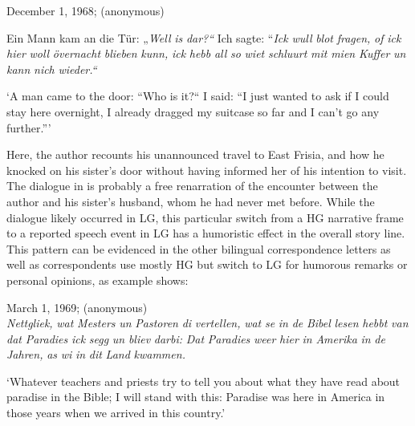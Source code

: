 \documentclass[output=paper]{langsci/langscibook}
\begin{document}
  
\ea
\label{ex:rocker:11}
December 1, 1968; (anonymous)\smallskip\\\relax 
 
Ein Mann kam an die Tür: „\textit{Well} \textit{is} \textit{dar?“} Ich sagte: “\textit{Ick} \textit{wull} \textit{blot} \textit{fragen,} \textit{of} \textit{ick} \textit{hier} \textit{woll} \textit{övernacht} \textit{blieben} \textit{kunn,} \textit{ick} \textit{hebb} \textit{all} \textit{so} \textit{wiet} \textit{schluurt} \textit{mit} \textit{mien} \textit{Kuffer} \textit{un} \textit{kann} \textit{nich} \textit{wieder.“}\smallskip\\\relax 

‘A man came to the door: “Who is it?“ I said: “I just wanted to ask if I could stay here overnight, I already dragged my suitcase so far and I can’t go any further.”’
\z

Here, the author recounts his unannounced travel to East Frisia, and how he knocked on his sister’s door without having informed her of his intention to visit. The dialogue in  is probably a free renarration of the encounter between the author and his sister’s husband, whom he had never met before. While the dialogue likely occurred in LG, this particular switch from a HG narrative frame to a reported speech event in LG has a humoristic effect in the overall story line. This pattern can be evidenced in the other bilingual correspondence letters as well as correspondents use mostly HG but switch to LG for humorous remarks or personal opinions, as example  shows:

 
\ea
\label{ex:rocker:12} 
March 1, 1969; (anonymous)\smallskip\\\relax 
\textit{Nettgliek,} \textit{wat} \textit{Mesters} \textit{un} \textit{Pastoren} \textit{di} \textit{vertellen,} \textit{wat} \textit{se} \textit{in} \textit{de} \textit{Bibel} \textit{lesen} \textit{hebbt} \textit{van} \textit{dat} \textit{Paradies} \textit{ick} \textit{segg} \textit{un} \textit{bliev} \textit{darbi:} \textit{Dat} \textit{Paradies} \textit{weer} \textit{hier} \textit{in} \textit{Amerika} \textit{in} \textit{de} \textit{Jahren,} \textit{as} \textit{wi} \textit{in} \textit{dit} \textit{Land} \textit{kwammen.} \smallskip\\\relax 

‘Whatever teachers and priests try to tell you about what they have read about paradise in the Bible; I will stand with this: Paradise was here in America in those years when we arrived in this country.’
\z
\end{document}
